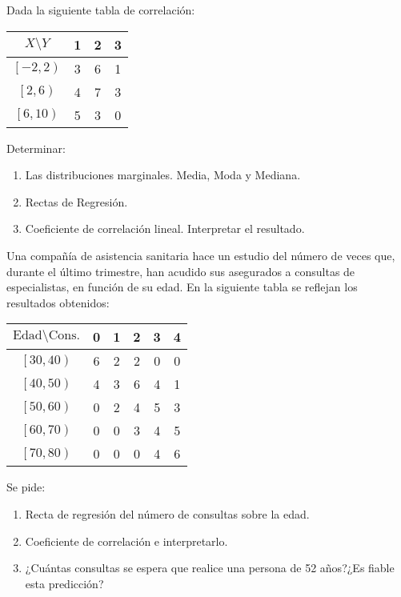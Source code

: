 
{Dada la siguiente tabla de correlación:
\begin{center}
\begin{tabular}{|c||c|c|c|}
\hline
$X\setminus Y$ & 1 & 2 & 3 \\ \hline\hline
$\left[ -2,2\right) $ & 3 & 6 & 1 \\ \hline
$\left[ 2,6\right) $ & 4 & 7 & 3 \\ \hline
$\left[ 6,10\right) $ & 5 & 3 & 0 \\ \hline
\end{tabular}
\end{center}

Determinar:
\begin{enumerate}
\item  Las distribuciones marginales. Media, Moda y Mediana.
\item  Rectas de Regresión.
\item  Coeficiente de correlación lineal. Interpretar el resultado.
\end{enumerate}
}
{}
{}


{Una compañía de asistencia sanitaria hace un estudio del número de veces que, durante el último trimestre, han acudido sus asegurados a consultas de especialistas, en función de su edad. En la siguiente tabla se reflejan los resultados obtenidos:
\begin{center}
\begin{tabular}{|c||c|c|c|c|c|}
\hline
$\mbox{Edad}\setminus \mbox{Cons.}$ & 0 & 1 & 2 & 3 & 4 \\ \hline\hline
$\left[ 30,40\right) $ & 6 & 2 & 2 & 0 & 0  \\ \hline
$\left[ 40,50\right) $ & 4 & 3 & 6 & 4 & 1 \\ \hline
$\left[ 50,60\right) $ & 0 & 2 & 4 & 5 & 3 \\ \hline
$\left[ 60,70\right) $ & 0 & 0 & 3 & 4 & 5 \\ \hline
$\left[ 70,80\right) $ & 0 & 0 & 0 & 4 & 6 \\ \hline
\end{tabular}
\end{center}

Se pide:
\begin{enumerate}
\item Recta de regresión del número de consultas sobre la edad.
\item Coeficiente de correlación e interpretarlo.
\item ¿Cuántas consultas se espera que realice una persona de 52 años?¿Es fiable esta predicción?
\end{enumerate}
}
{}
{}



